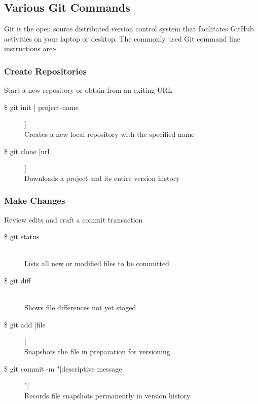 \subsection{Various Git Commands}

Git is the open source distributed version control system that facilitates GitHub activities on your laptop or desktop. The commonly used Git command line instructions are:-\\

\subsubsection{Create Repositories}
Start a new repository or obtain from an exiting URL

\begin{description}

\item [\$ git init [ project-name]]\\
Creates a new local repository with the specified name
\item [\$ git clone [url]]\\
Downloads a project and its entire version history\\

\end{description}


\subsubsection{Make Changes}
Review edits and craft a commit transaction

\begin{description}

\item [\$ git status] \leavevmode \\
Lists all new or modified files to be committed

\item [\$ git diff] \leavevmode \\
Shows file differences not yet staged

\item [\$ git add [file]]\\
Snapshots the file in preparation for versioning

\item [\$ git commit -m "[descriptive message]"]\\
Records file snapshots permanently in version history\\

\end{description}


